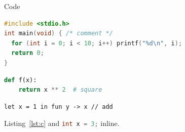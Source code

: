 \documentclass{article}
\begin{document}
\lstlistingname{Code}\lstlistoflistings
\begin{lstlisting}[language=C,caption={A C program},label=lst:c]
#include <stdio.h>
int main(void) { /* comment */
  for (int i = 0; i < 10; i++) printf("%d\n", i);
  return 0;
}
\end{lstlisting}
\begin{lstlisting}[language=Python,caption=Python]
def f(x):
    return x ** 2  # square
\end{lstlisting}
\begin{lstlisting}[language=mini]
let x = 1 in fun y -> x // add
\end{lstlisting}
Listing~\ref{lst:c} and \lstinline[language=C]|int x = 3;| inline.
\end{document}
